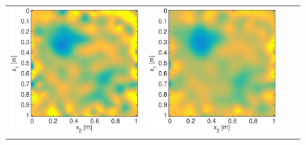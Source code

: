 \documentclass{iopart}
\begin{document}
\begin{figure}
\begin{tabular}{cccc}
\includegraphics[scale=.2]{./figs/2D_exp4_f}&
\includegraphics[scale=.2]{./figs/2D_exp4_g}&

\end{tabular}
\end{figure}
\end{document}
